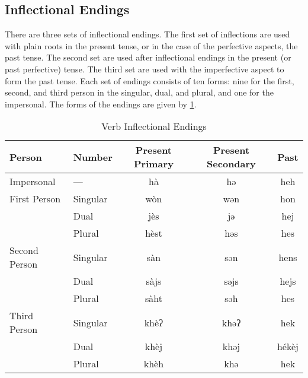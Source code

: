 \subsection{Inflectional Endings}
There are three sets of inflectional endings. The first set of inflections are
used with plain roots in the present tense, or in the case of the perfective
aspects, the past tense. The second set are used after inflectional endings in
the present (or past perfective) tense. The third set are used with the
imperfective aspect to form the past tense. Each set of endings consists of ten
forms: nine for the first, second, and third person in the singular, dual, and
plural, and one for the impersonal. The forms of the endings are given by
\cref{tab:verb inflectional endings}.

\begin{table}[h]
\centering
\caption{Verb Inflectional Endings}
\label{tab:verb inflectional endings}
\begin{tabular}{ll*{3}{>{\ll}c}}
    \toprule
    Person & Number & \rm \parbox{2cm}{\centering Present Primary} & \rm
    \parbox{2cm}{\centering Present Secondary} & \rm Past \\ \midrule
    Impersonal    & —        & hà   & hə   & heh   \\ \midrule
    First Person  & Singular & wòn  & wən  & hon   \\
                  & Dual     & jès  & jə   & hej   \\
                  & Plural   & hèst & həs  & hes   \\ \midrule
    Second Person & Singular & sàn  & sən  & hens  \\
                  & Dual     & sàjs & səjs & hejs  \\
                  & Plural   & sàht & səh  & hes   \\ \midrule
    Third Person  & Singular & khèʔ & khəʔ & hek   \\
                  & Dual     & khèj & khəj & hékèj \\
                  & Plural   & khèh & khə  & hek   \\
    \bottomrule
\end{tabular}
\end{table}

